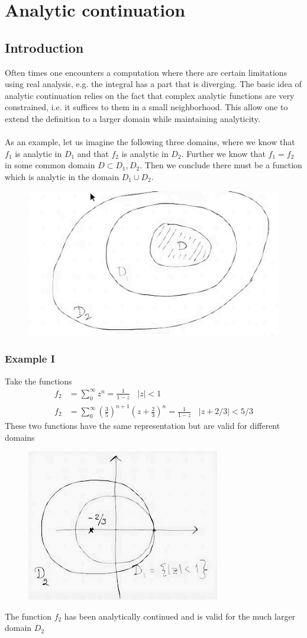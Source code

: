 \documentclass[a4paper,12pt]{article}
\begin{document}
\section{Analytic continuation}
\subsection{Introduction}
Often times one encounters a computation where there are certain limitations using real analysis, e.g. the integral has a part that is diverging. The basic idea of analytic continuation relies on the fact that complex analytic functions are very constrained, i.e. it suffices to them in a small neighborhood. This allow one to extend the definition to a larger domain while maintaining analyticity.
\\\\
As an example, let us imagine the following three domains, where we know that $f_1$ is analytic in $D_1$ and that $f_2$ is analytic in $D_2$. Further we know that $f_1=f_2$ in some common domain $D\subset D_1,D_2$. Then we conclude there must be a function which is analytic in the domain $D_1\cup D_2$.
\begin{figure}[H]
	\centering
	\includegraphics[width=0.5\linewidth]{17}
	\caption{}
	\label{fig:4}
\end{figure}
\subsubsection{Example I}
Take the functions
\begin{equation}
\begin{aligned}
f_2&=\sum_0^{\infty}z^n=\frac{1}{1-z}~~~~|z|<1\\
f_2&=\sum_0^{\infty}\left(\frac{3}{5}\right)^{n+1}\left(z+\frac{2}{3}\right)^n=\frac{1}{1-z}~~~~|z+2/3|<5/3
\end{aligned}
\end{equation}
These two functions have the same representation but are valid for different domains
\begin{figure}[H]
	\centering
	\includegraphics[width=0.5\linewidth]{18}
	\caption{}
	\label{fig:4}
\end{figure}
The function $f_2$ has been analytically continued and is valid for the much larger domain $D_2$
\end{document}
